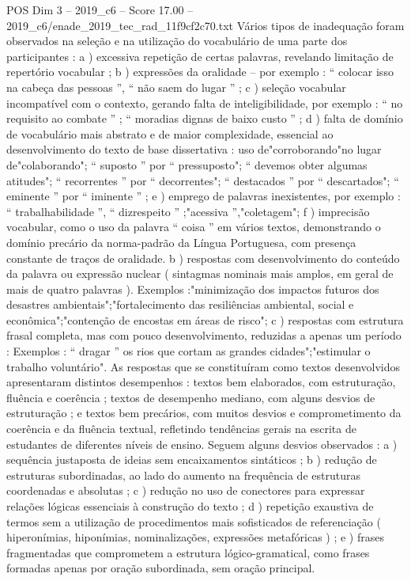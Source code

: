 \begin{textsample}{POS Dim 3 – 2019\_c6 – Score 17.00 – 2019\_c6/enade\_2019\_tec\_rad\_11f9cf2c70.txt}
Vários tipos de inadequação foram observados na seleção e na utilização do vocabulário de uma parte dos participantes : a ) excessiva repetição de certas palavras, revelando limitação de repertório vocabular ; b ) expressões da oralidade – por exemplo : “ colocar isso na cabeça das pessoas ”, “ não saem do lugar ” ; c ) seleção vocabular incompatível com o contexto, gerando falta de inteligibilidade, por exemplo : “ no requisito ao combate ” ; “ moradias dignas de baixo custo ” ; d ) falta de domínio de vocabulário mais abstrato e de maior complexidade, essencial ao desenvolvimento do texto de base dissertativa : uso de"corroborando"no lugar de"colaborando"; “ suposto ” por “ pressuposto"; “ devemos obter algumas atitudes"; “ recorrentes ” por “ decorrentes"; “ destacados ” por “ descartados"; “ eminente ” por “ iminente ” ; e ) emprego de palavras inexistentes, por exemplo : “ trabalhabilidade ”, “ dizrespeito ” ;"acessiva ”,"coletagem"; f ) imprecisão vocabular, como o uso da palavra “ coisa ” em vários textos, demonstrando o domínio precário da norma-padrão da Língua Portuguesa, com presença constante de traços de oralidade. b ) respostas com desenvolvimento do conteúdo da palavra ou expressão nuclear ( sintagmas nominais mais amplos, em geral de mais de quatro palavras ).
Exemplos :"minimização dos impactos futuros dos desastres ambientais";"fortalecimento das resiliências ambiental, social e econômica";"contenção de encostas em áreas de risco"; c ) respostas com estrutura frasal completa, mas com pouco desenvolvimento, reduzidas a apenas um período : Exemplos : “ dragar ” os rios que cortam as grandes cidades";"estimular o trabalho voluntário".
As respostas que se constituíram como textos desenvolvidos apresentaram distintos desempenhos : textos bem elaborados, com estruturação, fluência e coerência ; textos de desempenho mediano, com alguns desvios de estruturação ; e textos bem precários, com muitos desvios e comprometimento da coerência e da fluência textual, refletindo tendências gerais na escrita de estudantes de diferentes níveis de ensino.
Seguem alguns desvios observados : a ) sequência justaposta de ideias sem encaixamentos sintáticos ; b ) redução de estruturas subordinadas, ao lado do aumento na frequência de estruturas coordenadas e absolutas ; c ) redução no uso de conectores para expressar relações lógicas essenciais à construção do texto ; d ) repetição exaustiva de termos sem a utilização de procedimentos mais sofisticados de referenciação ( hiperonímias, hiponímias, nominalizações, expressões metafóricas ) ; e ) frases fragmentadas que comprometem a estrutura lógico-gramatical, como frases formadas apenas por oração subordinada, sem oração principal.

\end{textsample}
